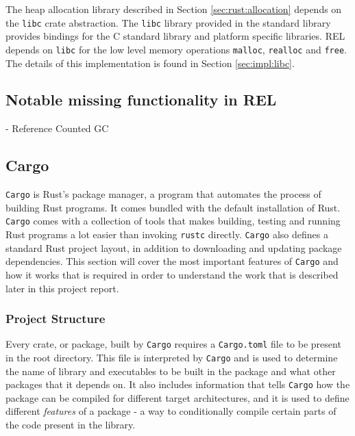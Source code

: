 The heap allocation library described in Section \ref{sec:rust:allocation} depends on the \texttt{libc} crate abstraction.
The \texttt{libc} library provided in the standard library provides bindings for the C standard library and platform specific libraries.
REL depends on \texttt{libc} for the low level memory operations \texttt{malloc}, \texttt{realloc} and \texttt{free}.
The details of this implementation is found in Section \ref{sec:impl:libc}. 

\subsection{Notable missing functionality in REL}

- Reference Counted GC

\subsection{Cargo}
\label{sec:cargo}

\texttt{Cargo} is Rust's package manager, a program that automates the process of building Rust programs.
It comes bundled with the default installation of Rust.
\texttt{Cargo} comes with a collection of tools that makes building, testing and running Rust programs a lot easier than invoking \texttt{rustc} directly.
\texttt{Cargo} also defines a standard Rust project layout, in addition to downloading and updating package dependencies.
This section will cover the most important features of \texttt{Cargo} and how it works that is required in order to understand the work that is described later in this project report.

\subsubsection{Project Structure}

Every crate, or package, built by \texttt{Cargo} requires a \texttt{Cargo.toml} file to be present in the root directory.
This file is interpreted by \texttt{Cargo} and is used to determine the name of library and executables to be built in the package and what other packages that it depends on.
It also includes information that tells \texttt{Cargo} how the package can be compiled for different target architectures, and it is used to define different \textit{features} of a package - a way to conditionally compile certain parts of the code present in the library.

